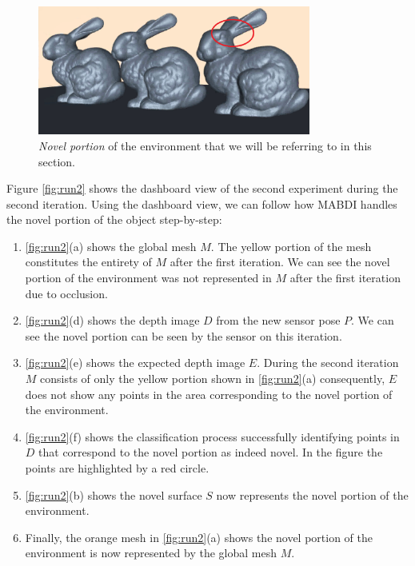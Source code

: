 \begin{figure}[h]%
\centering
  \includegraphics[width=0.8\textwidth]{figures/results_run2_novel_portion.png}
  \caption{\emph{Novel portion} of the environment that we will be referring to
  in this section.}
  \label{fig:run2_novel_portion}
\end{figure}

Figure \ref{fig:run2} shows the dashboard view of the second experiment during
the second iteration. Using the dashboard view, we can follow how MABDI handles
the novel portion of the object step-by-step:
\begin{enumerate}
  \item \ref{fig:run2}(a) shows the global mesh $M$. The yellow portion of the
  mesh constitutes the entirety of $M$ after the first iteration. We can see the
  novel portion of the environment was not represented in $M$ after the first
  iteration due to occlusion.
  \item \ref{fig:run2}(d) shows the depth image $D$ from the new sensor pose
  $P$. We can see the novel portion can be seen by the sensor on this iteration.
  \item \ref{fig:run2}(e) shows the expected depth image $E$. During the second
  iteration $M$ consists of only the yellow portion shown in \ref{fig:run2}(a)
  consequently, $E$ does not show any points in the area corresponding to the
  novel portion of the environment.
  \item \ref{fig:run2}(f) shows the classification process successfully
  identifying points in $D$ that correspond to the novel portion as indeed
  novel. In the figure the points are highlighted by a red circle.
  \item \ref{fig:run2}(b) shows the novel surface $S$ now represents the novel
  portion of the environment.
  \item Finally, the orange mesh in \ref{fig:run2}(a) shows the novel portion of
  the environment is now represented by the global mesh $M$.
\end{enumerate}

